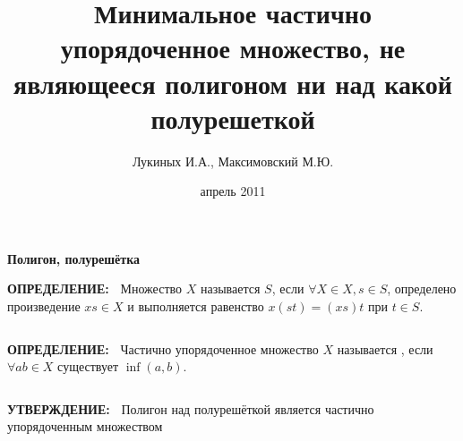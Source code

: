 \documentclass{beamer}
\title {Минимальное частично упорядоченное множество, не являющееся полигоном ни над какой полурешеткой}
\author{Лукиных И.А., Максимовский М.Ю.}
\date  {апрель 2011}
\newcommand{\green}{\color[rgb]{0,0.4,0}}
\newcommand{\blue}{\color{blue}}
\newcommand{\statement}{%
	 {\bf \green УТВЕРЖДЕНИЕ:\ }}
\newcommand{\definit}{%
     {\bf \green ОПРЕДЕЛЕНИЕ:\ }}
\newcommand{\retline}{
	
$ $

}
\begin{document}

\maketitle


\begin{frame}
{\bf {\blue} Полигон, полурешётка}

{\definit}
Множество $X$ называется \textit{\blue{полигоном над полугруппой}} $S$, если
$\forall X \in X, s \in S$, определено произведение
$xs \in X$ и выполняется равенство $x(st) = (xs)t$ при $t \in S$.
{\retline}

{\definit}
Частично упорядоченное множество $X$ называется \textit{\blue{полурешёткой}},
если $\forall a b \in X$ существует $\inf (a, b)$. 
{\retline}

{\statement}
Полигон над полурешёткой является частично упорядоченным множеством
\end{frame}
\end{document}
